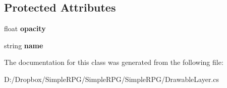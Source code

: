 \subsection*{Protected Attributes}
\begin{DoxyCompactItemize}
\item 
\hypertarget{class_simple_r_p_g_1_1_drawable_layer_a613c63f79a863ca37dbd1f18ea4c2915}{float {\bfseries opacity}}\label{class_simple_r_p_g_1_1_drawable_layer_a613c63f79a863ca37dbd1f18ea4c2915}

\item 
\hypertarget{class_simple_r_p_g_1_1_drawable_layer_ac006479228e4588dc3aef0d885c2cbfc}{string {\bfseries name}}\label{class_simple_r_p_g_1_1_drawable_layer_ac006479228e4588dc3aef0d885c2cbfc}

\end{DoxyCompactItemize}


The documentation for this class was generated from the following file\+:\begin{DoxyCompactItemize}
\item 
D\+:/\+Dropbox/\+Simple\+R\+P\+G/\+Simple\+R\+P\+G/\+Simple\+R\+P\+G/Drawable\+Layer.\+cs\end{DoxyCompactItemize}
